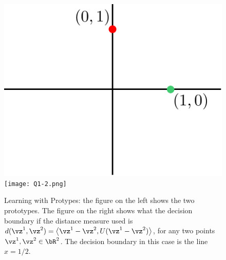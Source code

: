 \documentclass[a4paper,11pt]{article}
\begin{document}
\begin{mlsolution}
\begin{figure}[th]%
\centering
\includegraphics[width=0.3\columnwidth]{proto_blank.png}%
\hfill
\texttt{[image: Q1-2.png]}%
\caption{Learning with Protypes: the figure on the left shows the two prototypes. The figure on the right shows what the decision boundary if the distance measure used is $d(\vz^1,\vz^2) =\left \langle \vz^1-\vz^2, U (\vz^1-\vz^2) \right \rangle$, for any two points $\vz^1,\vz^2 \in \bR^2$. The decision boundary in this case is the line $x = 1/2$.}%
\label{fig:proto2}%
\end{figure}

\end{mlsolution}
\end{document}
